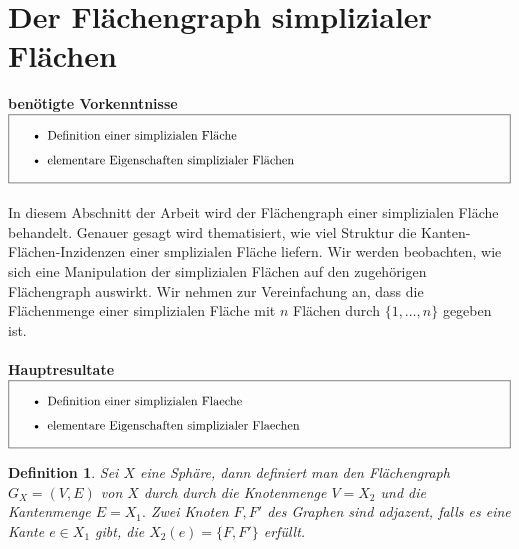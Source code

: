 \documentclass[12pt,titlepage,twoside,cleardoublepage]{article}
\theoremstyle{nummermitklammern}
\newtheorem{definition}[temp]{Definition}
\newtheorem{definition}[zahl]{Definition}
\numberwithin{equation}{section}
\begin{document}
\section{Der Flächengraph simplizialer Flächen}
\textbf{benötigte Vorkenntnisse}\\
$\fbox{
\parbox{14cm}{\begin{itemize}
\item Definition einer simplizialen Fl\"ache 
\item elementare Eigenschaften simplizialer Fl\"achen
\end{itemize}
}}$\\\\
In diesem Abschnitt der Arbeit wird der Flächengraph einer simplizialen Fläche behandelt. Genauer gesagt wird thematisiert, wie viel Struktur die Kanten-Flächen-Inzidenzen einer smplizialen Fläche liefern. Wir werden beobachten, wie sich eine Manipulation der simplizialen Flächen auf den zugehörigen Flächengraph auswirkt.  
Wir nehmen zur Vereinfachung an, dass die Flächenmenge einer simplizialen Fläche mit $n$ Flächen  durch $\{1,\ldots,n\}$ gegeben ist.\\\\
\textbf{Hauptresultate}\\
$\fbox{
\parbox{14cm}{\begin{itemize}
\item Definition einer simplizialen Flaeche 
\item elementare Eigenschaften simplizialer Flaechen
\end{itemize}
}}$\\
\begin{definition}
Sei $X$ eine Sphäre, dann definiert man den Flächengraph $G_X=(V,E)$ von $X$ durch durch die Knotenmenge $V=X_2$ und die Kantenmenge $E=X_1.$ Zwei Knoten $F,F'$ des Graphen sind adjazent, falls es eine Kante $e\in X_1$ gibt, die $X_2(e)=\{F,F'\}$ erfüllt. 
\end{definition}
\end{document}
